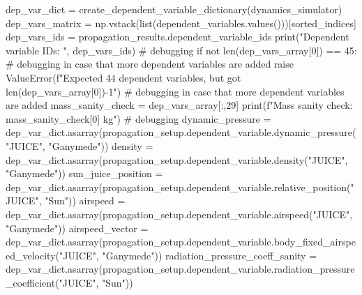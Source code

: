 {}
\markdownRendererSectionEnd \markdownRendererSectionBegin
{}\markdownRendererInterblockSeparator
{}dep_var_dict = create_dependent_variable_dictionary(dynamics_simulator) dep_vars_matrix = np.vstack(list(dependent_variables.values()))[sorted_indices] dep_vars_ids = propagation_results.dependent_variable_ids print("Dependent variable IDs: ", dep_vars_ids) # debugging if not len(dep_vars_array[0]) == 45: # debugging in case that more dependent variables are added raise ValueError(f"Expected 44 dependent variables, but got {len(dep_vars_array[0])-1}") # debugging in case that more dependent variables are added\markdownRendererInterblockSeparator
{}
\markdownRendererSectionEnd \markdownRendererSectionBegin
{}\markdownRendererInterblockSeparator
{}
\markdownRendererSectionEnd \markdownRendererSectionBegin
{}\markdownRendererInterblockSeparator
{}mass_sanity_check = dep_vars_array[:,29] print(f"Mass sanity check: {mass_sanity_check[0]} kg") # debugging\markdownRendererInterblockSeparator
{}
\markdownRendererSectionEnd \markdownRendererSectionBegin
{}\markdownRendererInterblockSeparator
{}
\markdownRendererSectionEnd \markdownRendererSectionBegin
{}\markdownRendererInterblockSeparator
{}
\markdownRendererSectionEnd \markdownRendererSectionBegin
{}\markdownRendererInterblockSeparator
{}dynamic_pressure = dep_var_dict.asarray(propagation_setup.dependent_variable.dynamic_pressure("JUICE", "Ganymede"))\markdownRendererInterblockSeparator
{}
\markdownRendererSectionEnd \markdownRendererSectionBegin
{}\markdownRendererInterblockSeparator
{}density = dep_var_dict.asarray(propagation_setup.dependent_variable.density("JUICE", "Ganymede")) sun_juice_position = dep_var_dict.asarray(propagation_setup.dependent_variable.relative_position("JUICE", "Sun")) airspeed = dep_var_dict.asarray(propagation_setup.dependent_variable.airspeed("JUICE", "Ganymede")) airspeed_vector = dep_var_dict.asarray(propagation_setup.dependent_variable.body_fixed_airspeed_velocity("JUICE", "Ganymede")) radiation_pressure_coeff_sanity = dep_var_dict.asarray(propagation_setup.dependent_variable.radiation_pressure_coefficient("JUICE", "Sun"))\markdownRendererInterblockSeparator
